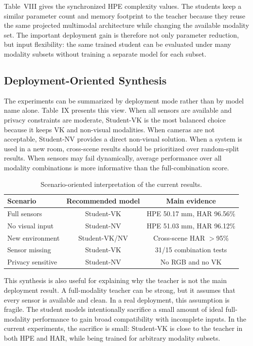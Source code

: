 \documentclass[journal, twocolumn, transmag]{IEEEtran}
\newcommand{\smalltab}{\scriptsize}
\begin{document}
Table~VIII gives the synchronized HPE complexity values. The students keep a similar parameter count and memory footprint to the teacher because they reuse the same projected multimodal architecture while changing the available modality set. The important deployment gain is therefore not only parameter reduction, but input flexibility: the same trained student can be evaluated under many modality subsets without training a separate model for each subset.

\subsection{Deployment-Oriented Synthesis}
The experiments can be summarized by deployment mode rather than by model name alone. Table~IX presents this view. When all sensors are available and privacy constraints are moderate, Student-VK is the most balanced choice because it keeps VK and non-visual modalities. When cameras are not acceptable, Student-NV provides a direct non-visual solution. When a system is used in a new room, cross-scene results should be prioritized over random-split results. When sensors may fail dynamically, average performance over all modality combinations is more informative than the full-combination score.

\begin{table}[t]
	\caption{Scenario-oriented interpretation of the current results.}
	\label{tab:deployment}
	\centering
	\smalltab
	\begin{tabular}{lcc}
		\toprule
		Scenario & Recommended model & Main evidence\\
		\midrule
		Full sensors & Student-VK & HPE 50.17 mm, HAR 96.56\%\\
		No visual input & Student-NV & HPE 51.03 mm, HAR 96.12\%\\
		New environment & Student-VK/NV & Cross-scene HAR $>$95\%\\
		Sensor missing & Student-VK & 31/15 combination tests\\
		Privacy sensitive & Student-NV & No RGB and no VK\\
		\bottomrule
	\end{tabular}
\end{table}

This synthesis is also useful for explaining why the teacher is not the main deployment result. A full-modality teacher can be strong, but it assumes that every sensor is available and clean. In a real deployment, this assumption is fragile. The student models intentionally sacrifice a small amount of ideal full-modality performance to gain broad compatibility with incomplete inputs. In the current experiments, the sacrifice is small: Student-VK is close to the teacher in both HPE and HAR, while being trained for arbitrary modality subsets.
\end{document}
